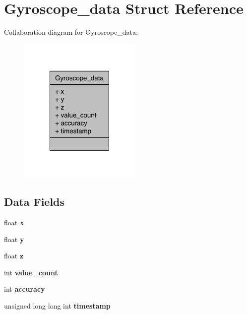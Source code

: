 \section{Gyroscope\-\_\-data Struct Reference}
\label{struct__3d__data}


Collaboration diagram for Gyroscope\-\_\-data\-:\nopagebreak
\begin{figure}[H]
\begin{center}
\leavevmode
\includegraphics[width=168pt]{struct__3d__data__coll__graph}
\end{center}
\end{figure}
\subsection*{Data Fields}
\begin{DoxyCompactItemize}
\item 
float {\bfseries x}\label{struct__3d__data_a0c31bfc2e194e0dbbc49cc7c7fc618f7}

\item 
float {\bfseries y}\label{struct__3d__data_a5e1b129b17b1e6ea12ff55fe77ad869f}

\item 
float {\bfseries z}\label{struct__3d__data_a61138bed3867232c4492267b848f5d2c}

\item 
int {\bfseries value\-\_\-count}\label{struct__3d__data_abf551f62d36ae9d11a45d6190a8ce5c9}

\item 
int {\bfseries accuracy}\label{struct__3d__data_a797c011d45c67bea55fae4862e68588b}

\item 
unsigned long long int {\bfseries timestamp}\label{struct__3d__data_a40927dec34808fdd878f805bd5c942ab}

\end{DoxyCompactItemize}


